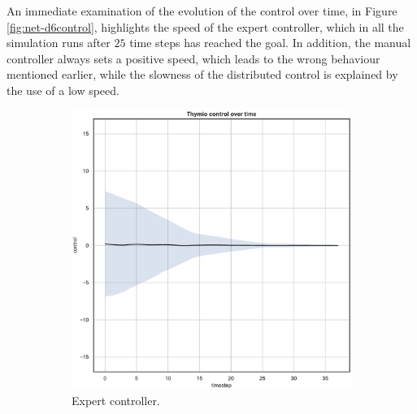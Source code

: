 An immediate examination of the evolution of the control over time, in Figure 
\ref{fig:net-d6control}, highlights the speed of the expert controller, which in all 
the simulation runs after $25$ time steps has reached the goal. 
In addition, the manual controller always sets a positive speed, which leads to the 
wrong behaviour mentioned earlier, while the slowness of the distributed 
control is explained by the use of a low speed.
\begin{figure}[!htb]
	\centering
	\begin{subfigure}[h]{0.3\textwidth}
		\centering
		\includegraphics[width=\textwidth]{contents/images/net-d6/control-overtime-omniscient}%
		\caption{Expert controller.}
	\end{subfigure}
	\hfill
	\begin{subfigure}[h]{0.3\textwidth}
		\centering

\end{subfigure}
\end{figure}
